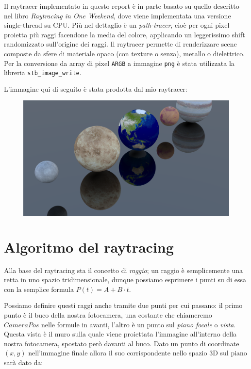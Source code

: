 \documentclass[12pt, twoside]{article}
\begin{document}
Il raytracer implementato in questo report è in parte basato su quello
descritto nel libro \textit{Raytracing in One Weekend}\cite{raytracingin1weekend}, dove
viene implementata una versione single-thread su CPU.
Più nel dettaglio è un \textit{path-tracer}, cioè per ogni pixel proietta più
raggi facendone la media del colore, applicando un leggerissimo shift
randomizzato sull'origine dei raggi.
Il raytracer permette di renderizzare scene composte da sfere di materiale
opaco (con texture o senza), metallo o dielettrico.
Per la conversione da array di pixel \texttt{ARGB} a immagine \texttt{png}
è stata utilizzata la libreria \texttt{stb\_image\_write}\cite{stb}. 

L'immagine qui di seguito è stata prodotta dal mio raytracer:

\begin{figure}[h]
  \centering
  \includegraphics[width=\linewidth,keepaspectratio]{images/renders/planets.png}
\end{figure}

\section{Algoritmo del raytracing}
Alla base del raytracing sta il concetto di \textit{raggio}; un raggio è
semplicemente una retta in uno spazio tridimensionale, dunque possiamo
esprimere i punti su di essa con la semplice formula $P(t) = A + B \cdot t$.

Possiamo definire questi raggi anche tramite due punti per cui passano: il
primo punto è il buco della nostra fotocamera, una costante che chiameremo
$CameraPos$ nelle formule in avanti, l'altro è un punto sul
\textit{piano focale} o \textit{vista}.
Questa vista è il muro sulla quale viene proiettata l'immagine all'interno
della nostra fotocamera, spostato però davanti al buco.
Dato un punto di coordinate $(x, y)$ nell'immagine finale allora il suo
corrispondente nello spazio 3D sul piano sarà dato da:
\end{document}
